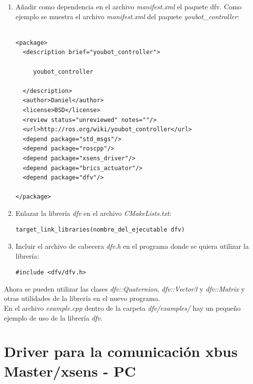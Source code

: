 \documentclass[12pt, a4paper]{report}
\begin{document}
\begin{enumerate}
\item Añadir como dependencia en el archivo \textit{manifest.xml} el paquete dfv. Como ejemplo se muestra el archivo \textit{manifest.xml} del paquete \textit{youbot\_controller}:

\begin{lstlisting}

<package>
  <description brief="youbot_controller">

     youbot_controller

  </description>
  <author>Daniel</author>
  <license>BSD</license>
  <review status="unreviewed" notes=""/>
  <url>http://ros.org/wiki/youbot_controller</url>
  <depend package="std_msgs"/>
  <depend package="roscpp"/>
  <depend package="xsens_driver"/>
  <depend package="brics_actuator"/>
  <depend package="dfv"/>

</package>

\end{lstlisting}

\item Enlazar la librería \textit{dfv} en el archivo \textit{CMakeLists.txt}:

\begin{lstlisting}
target_link_libraries(nombre_del_ejecutable dfv)
\end{lstlisting}

\item Incluir el archivo de cabecera \textit{dfv.h} en el programa donde se quiera utilizar la librería:

\begin{lstlisting}
#include <dfv/dfv.h>
\end{lstlisting}

\end{enumerate}

Ahora se pueden utilizar las clases \textit{dfv::Quaternion}, \textit{dfv::Vector3} y \textit{dfv::Matrix} y otras utilidades de la librería en el nuevo programa.\\

En el archivo \textit{example.cpp} dentro de la carpeta \textit{dfv/examples/} hay un pequeño ejemplo de uso de la librería \textit{dfv}.



\section{Driver para la comunicación xbus Master/xsens - PC}
\end{document}
